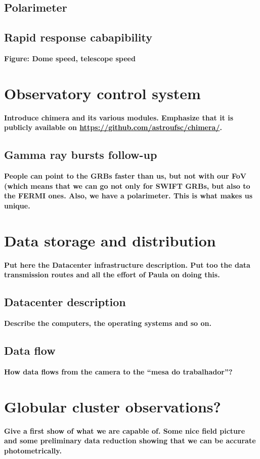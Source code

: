 \documentclass[12pt,preprint]{aastex}
\begin{document}
\subsection{Polarimeter}

\subsection{Rapid response cabapibility}
{\bf \color{red} Figure: Dome speed, telescope speed}

\section{Observatory control system}
{\bf \color{red} Introduce chimera and its various modules. Emphasize that it is publicly available on \url{https://github.com/astroufsc/chimera/}. }

\subsection{Gamma ray bursts follow-up}
{\bf \color{red} People can point to the GRBs faster than us, but not with our FoV (which means that we can go not only for SWIFT GRBs, but also to the FERMI ones. Also, we have a polarimeter. This is what makes us unique.}

\section{Data storage and distribution}
{\bf \color{red} Put here the Datacenter infrastructure description. Put too the data transmission routes and all the effort of Paula on doing this.}

\subsection{Datacenter description}
{\bf \color{red} Describe the computers, the operating systems and so on.}

\subsection{Data flow}
{\bf \color{red} How data flows from the camera to the ``mesa do trabalhador''?}

\section{Globular cluster observations?}
{\bf \color{red} Give a first show of what we are capable of. Some nice field picture and some preliminary data reduction showing that we can be accurate photometrically.}
\end{document}
